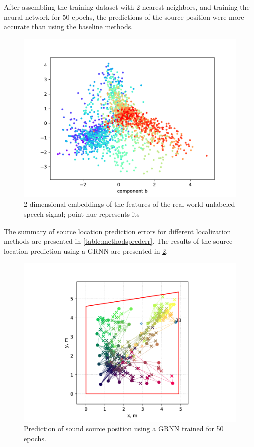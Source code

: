 \documentclass[applsci,article,submit,moreauthors,pdftex]{Definitions/mdpi}
\begin{document}
After assembling the training dataset with 2 nearest neighbors, and training the neural network for 50 epochs, the predictions of the source position were more accurate than using the baseline methods.



\begin{figure}[h!]
	\centering
	\includegraphics[width=0.5\linewidth]{img/from_diser/real_speech_isomap_framedur_0p05}
	\caption{2-dimensional \isomap{} embeddings of the \srpphat{} features of the real-world unlabeled speech signal; point hue represents its}
	\label{fig:realspeechisomapframedur0p05}
\end{figure}

The summary of source location prediction errors for different localization methods are presented in \tablename{} \ref{table:methodsprederr}.
The results of the source location prediction using a GRNN are presented in \figurename{} \ref{fig:grnnpredictionsrealspeecharch350epochsframedur0p05}.


\begin{figure}[h!]
	\centering
	\includegraphics[width=0.32\linewidth,clip,trim=3cm 0 3cm 0]{img/from_diser/grnn_predictions_real_speech_arch3_50epochs_framedur_0p05}
	\caption{Prediction of sound source position using a GRNN trained for 50 epochs.}
	\label{fig:grnnpredictionsrealspeecharch350epochsframedur0p05}
\end{figure}
\end{document}
